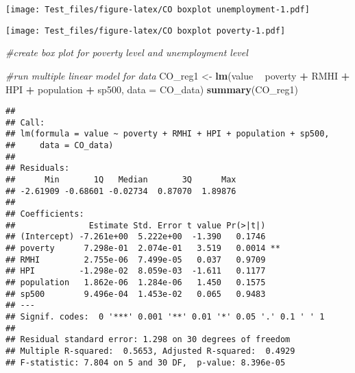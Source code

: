 \documentclass[
]{article}
\newenvironment{Shaded}{\begin{snugshade}}{\end{snugshade}}
\newcommand{\CommentTok}[1]{\textcolor[rgb]{0.56,0.35,0.01}{\textit{#1}}}
\newcommand{\DataTypeTok}[1]{\textcolor[rgb]{0.13,0.29,0.53}{#1}}
\newcommand{\KeywordTok}[1]{\textcolor[rgb]{0.13,0.29,0.53}{\textbf{#1}}}
\newcommand{\NormalTok}[1]{#1}
\newcommand{\OperatorTok}[1]{\textcolor[rgb]{0.81,0.36,0.00}{\textbf{#1}}}
\newcommand{\StringTok}[1]{\textcolor[rgb]{0.31,0.60,0.02}{#1}}
\begin{document}
\texttt{[image: Test\_files/figure-latex/CO boxplot unemployment-1.pdf]}

\begin{Shaded}
\end{Shaded}

\texttt{[image: Test\_files/figure-latex/CO boxplot poverty-1.pdf]}

\begin{Shaded}
\begin{Highlighting}[]
\CommentTok{#create box plot for poverty level and unemployment level}
\end{Highlighting}
\end{Shaded}

\begin{Shaded}
\begin{Highlighting}[]
\CommentTok{#run multiple linear model for data}
\NormalTok{CO_reg1 <-}\StringTok{ }\KeywordTok{lm}\NormalTok{(value }\OperatorTok{~}\StringTok{ }\NormalTok{poverty }\OperatorTok{+}\StringTok{ }\NormalTok{RMHI }\OperatorTok{+}\StringTok{ }\NormalTok{HPI }\OperatorTok{+}\StringTok{ }\NormalTok{population }\OperatorTok{+}\StringTok{ }\NormalTok{sp500, }\DataTypeTok{data =}\NormalTok{ CO_data)}
\KeywordTok{summary}\NormalTok{(CO_reg1)}
\end{Highlighting}
\end{Shaded}

\begin{verbatim}
## 
## Call:
## lm(formula = value ~ poverty + RMHI + HPI + population + sp500, 
##     data = CO_data)
## 
## Residuals:
##      Min       1Q   Median       3Q      Max 
## -2.61909 -0.68601 -0.02734  0.87070  1.89876 
## 
## Coefficients:
##               Estimate Std. Error t value Pr(>|t|)   
## (Intercept) -7.261e+00  5.222e+00  -1.390   0.1746   
## poverty      7.298e-01  2.074e-01   3.519   0.0014 **
## RMHI         2.755e-06  7.499e-05   0.037   0.9709   
## HPI         -1.298e-02  8.059e-03  -1.611   0.1177   
## population   1.862e-06  1.284e-06   1.450   0.1575   
## sp500        9.496e-04  1.453e-02   0.065   0.9483   
## ---
## Signif. codes:  0 '***' 0.001 '**' 0.01 '*' 0.05 '.' 0.1 ' ' 1
## 
## Residual standard error: 1.298 on 30 degrees of freedom
## Multiple R-squared:  0.5653, Adjusted R-squared:  0.4929 
## F-statistic: 7.804 on 5 and 30 DF,  p-value: 8.396e-05
\end{verbatim}
\end{document}
